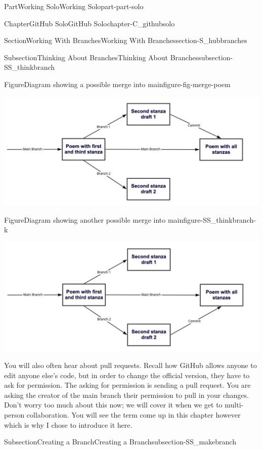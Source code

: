 \documentclass[twoside,10pt,]{book}
\begin{document}
\begin{partptx}{Part}{Working Solo}{}{Working Solo}{}{}{part-part-solo}
\begin{chapterptx}{Chapter}{GitHub Solo}{}{GitHub Solo}{}{}{chapter-C_githubsolo}
\begin{sectionptx}{Section}{Working With Branches}{}{Working With Branches}{}{}{section-S_hubbranches}
\begin{subsectionptx}{Subsection}{Thinking About Branches}{}{Thinking About Branches}{}{}{subsection-SS_thinkbranch}
\begin{figureptx}{Figure}{Diagram showing a possible merge into main}{figure-fig-merge-poem}{}
\begin{image}{0.05}{0.9}{0.05}{}%
\includegraphics[width=\linewidth]{external/merge_poem1.pdf}
\end{image}%
\tcblower
\end{figureptx}%
\begin{figureptx}{Figure}{Diagram showing another possible merge into main}{figure-SS_thinkbranch-k}{}%
\begin{image}{0.05}{0.9}{0.05}{}%
\includegraphics[width=\linewidth]{external/merge_poem2.pdf}
\end{image}%
\tcblower
\end{figureptx}%
You will also often hear about pull requests. Recall how GitHub allows anyone to edit anyone else's code, but in order to change the official version, they have to ask for permission. The asking for permission is sending a pull request. You are asking the creator of the main branch their permission to pull in your changes. Don't worry too much about this now; we will cover it when we get to multi-person collaboration. You will see the term come up in this chapter however which is why I chose to introduce it here.%
\end{subsectionptx}
%
%
\typeout{************************************************}
\typeout{************************************************}
%
\begin{subsectionptx}{Subsection}{Creating a Branch}{}{Creating a Branch}{}{}{subsection-SS_makebranch}

\end{subsectionptx}
\end{sectionptx}
\end{chapterptx}
\end{partptx}
\end{document}
